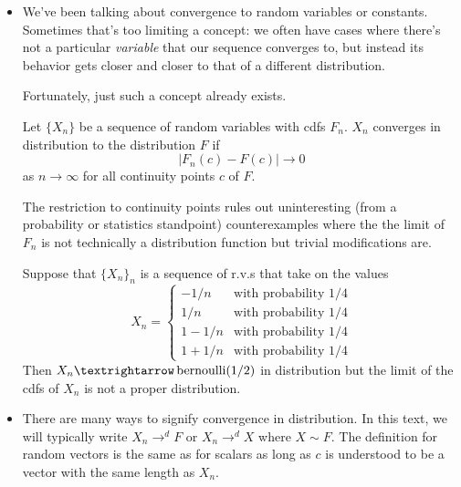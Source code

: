 \begin{itemize}

\item We've been talking about convergence to random variables or
  constants.  Sometimes that's too limiting a concept: we often have
  cases where there's not a particular \emph{variable} that our
  sequence converges to, but instead its behavior gets closer and
  closer to that of a different distribution.

  Fortunately, just such a concept already exists.

  \begin{defn}
    Let $\{X_n\}$ be a sequence of random variables with cdfs $F_n$.
    $X_n$ converges in distribution to the distribution $F$ if
    \begin{equation*}
      \lvert F_n(c) - F(c) \rvert → 0
    \end{equation*}
    as $n → ∞$ for all continuity points $c$ of $F$.
  \end{defn}

  The restriction to continuity points rules out uninteresting (from a
  probability or statistics standpoint) counterexamples where the the
  limit of $F_n$ is not technically a distribution function but
  trivial modifications are.

  \begin{ex}\label{convergenceInDist}
    Suppose that $\{X_n\}_n$ is a sequence of r.v.s that take on the
    values
    \begin{equation*}
      X_n =
      \begin{cases}
        -1/n & \text{with probability 1/4} \\
        1/n  & \text{with probability 1/4} \\
        1 - 1/n & \text{with probability 1/4} \\
        1 + 1/n & \text{with probability 1/4}
      \end{cases}
    \end{equation*}
    Then $X_n → \bernoulli(1/2)$ in distribution but the limit of the
    cdfs of $X_n$ is not a proper distribution.
  \end{ex}

\item There are many ways to signify convergence in distribution.  In
  this text, we will typically write $X_n →^d F$ or $X_n →^d X$ where
  $X ∼ F$.  The definition for random vectors is the same as for
  scalars as long as $c$ is understood to be a vector with the same
  length as $X_n$.


\end{itemize}
